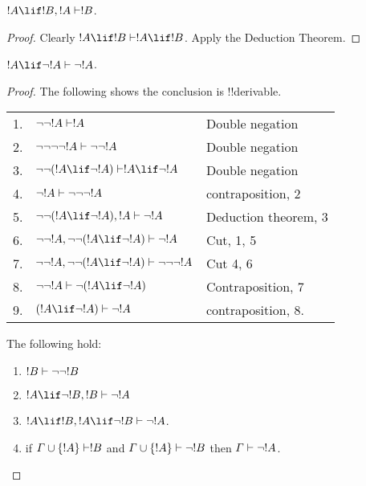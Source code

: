 \documentclass[../../include/open-logic-section]{subfiles}
\begin{document}
\begin{def}
  $!A \lif !B, !A \Proves !B$.
\end{def}

\begin{proof}
  Clearly $!A \lif !B \Proves !A\lif !B$. Apply the
  Deduction Theorem.
\end{proof}

\begin{def}
  $!A \lif \lnot !A \Proves \lnot !A$.
\end{def}

\begin{proof} The following shows the conclusion is !!{derivable}.
  
  \begin{tabular}{rll}
    1. & $\lnot\lnot!A \Proves !A$ & Double negation \\
    2. & $\lnot\lnot \lnot\lnot!A \Proves \lnot\lnot!A$
    & Double negation \\ 
    3. & $\lnot\lnot(!A \lif \lnot !A) \Proves !A
    \lif \lnot !A$ & Double negation\\
    4. & $\lnot!A \Proves \lnot\lnot\lnot !A$ &
    contraposition, 2\\ 
    5. & $\lnot\lnot(!A \lif \lnot !A), !A
    \Proves \lnot !A$ & Deduction theorem, 3 \\
    6. & $\lnot\lnot!A, \lnot\lnot(!A \lif \lnot
    !A) \Proves  \lnot !A$ & Cut, 1, 5 \\
    7. &  $\lnot\lnot!A, \lnot\lnot(!A \lif \lnot
    !A) \Proves  \lnot\lnot\lnot !A$ & Cut 4, 6 \\
    8. & $\lnot \lnot !A \Proves \lnot (!A \lif \lnot
    !A)$ & Contraposition, 7 \\
    9. & $(!A \lif \lnot !A) \Proves \lnot !A$ &
    contraposition, 8. 
 \end{tabular}

\begin{prop}  
The following hold:
  \begin{enumerate}
  \item $!B \Proves \lnot \lnot !B$
  \item $!A \lif \lnot !B, !B \Proves \lnot!A$
  \item $!A\lif !B,!A\lif\lnot !B  \Proves
    \lnot!A$.    
  \item if $\Gamma \cup \{ !A \}\Proves !B$ and $\Gamma
    \cup \{ !A\} \Proves \lnot !B$ then $\Gamma \Proves
    \lnot!A$.    
  \end{enumerate}
\end{prop}


\end{proof}
\end{document}
